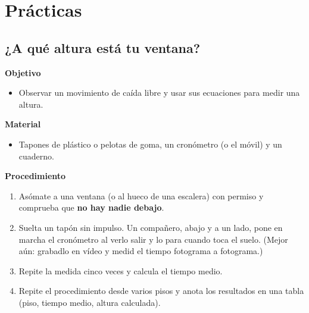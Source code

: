 \section{Prácticas}\label{sec:ud9-practicas}

\subsection{¿A qué altura está tu ventana?}

\noindent\begin{minipage}[t]{0.48\textwidth}
    \textbf{Objetivo}
    \begin{itemize}
        \item Observar un movimiento de caída libre y usar sus ecuaciones para medir una altura.
    \end{itemize}
\end{minipage}\hfill
\begin{minipage}[t]{0.48\textwidth}
    \textbf{Material}
    \begin{itemize}
        \item Tapones de plástico o pelotas de goma, un cronómetro (o el móvil) y un cuaderno.
    \end{itemize}
\end{minipage}

\textbf{Procedimiento}
\begin{enumerate}[label=\numberballgreen]
    \item Asómate a una ventana (o al hueco de una escalera) con permiso y comprueba que \textbf{no hay nadie debajo}.
    \item Suelta un tapón sin impulso. Un compañero, abajo y a un lado, pone en marcha el cronómetro al verlo salir y lo para cuando
    toca el suelo. (Mejor aún: grabadlo en vídeo y medid el tiempo fotograma a fotograma.)
    \item Repite la medida cinco veces y calcula el tiempo medio.
    \item Repite el procedimiento desde varios pisos y anota los resultados en una tabla (piso, tiempo medio, altura calculada).
\end{enumerate}


